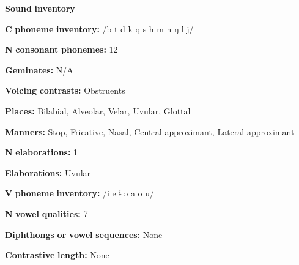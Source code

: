 \documentclass[output=paper]{langsci/langscibook}
\begin{document}
\begin{styleBody}
\textbf{Sound} \textbf{inventory}
\end{styleBody}

\begin{styleBody}
\textbf{C} \textbf{phoneme} \textbf{inventory:} /b t d k q s h m n ŋ l j/
\end{styleBody}

\begin{styleBody}
\textbf{N} \textbf{consonant} \textbf{phonemes:} 12
\end{styleBody}

\begin{styleBody}
\textbf{Geminates:} N/A
\end{styleBody}

\begin{styleBody}
\textbf{Voicing} \textbf{contrasts:} Obstruents
\end{styleBody}

\begin{styleBody}
\textbf{Places:} Bilabial, Alveolar, Velar, Uvular, Glottal
\end{styleBody}

\begin{styleBody}
\textbf{Manners:} Stop, Fricative, Nasal, Central approximant, Lateral approximant
\end{styleBody}

\begin{styleBody}
\textbf{N} \textbf{elaborations:} 1
\end{styleBody}

\begin{styleBody}
\textbf{Elaborations:} Uvular
\end{styleBody}

\begin{styleBody}
\textbf{V} \textbf{phoneme} \textbf{inventory:} /i e ɨ ə a o u/
\end{styleBody}

\begin{styleBody}
\textbf{N} \textbf{vowel} \textbf{qualities:} 7
\end{styleBody}

\begin{styleBody}
\textbf{Diphthongs} \textbf{or} \textbf{vowel} \textbf{sequences:} None
\end{styleBody}

\begin{styleBody}
\textbf{Contrastive} \textbf{length:} None
\end{styleBody}
\end{document}
